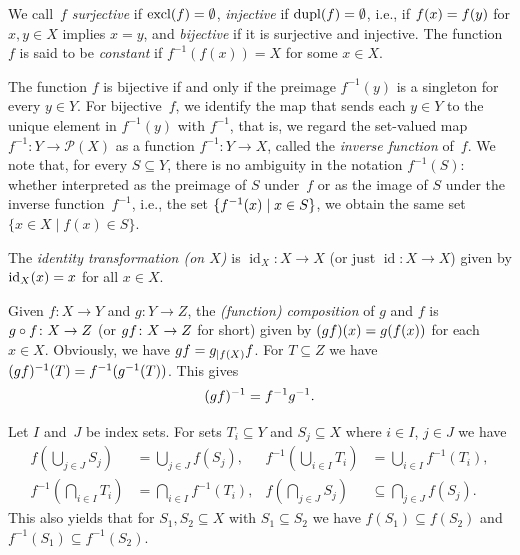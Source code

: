 We call~$f$ \emph{surjective} if $\excl{f} = \emptyset$, 
\emph{injective} 
if $\dupl{f} = \emptyset$, 
i.e., if $\applyfunc{x}{f} = \applyfunc{y}{f}$ for $x,y \in X$ implies $x = y$,
and \emph{bijective} if it is surjective and injective.
The function $f$ is said to be \emph{constant}
if $f^{-1}(f(x)) = X$ for some $x \in X$.

The function $f$ is bijective if and only if the preimage $f^{-1}(y)$ is a
singleton for every $y \in Y$. For bijective~$f$, we identify the map that
sends each $y \in Y$ to the unique element in $f^{-1}(y)$ with $f^{-1}$,
that is, we regard the set-valued map
$f^{-1} \colon Y \to \mathcal P(X)$ as a function
$f^{-1} \colon Y \to X$, called the \emph{inverse function} of~$f$.
We note that, for every $S \subseteq Y$, there is no ambiguity in the notation
$f^{-1}(S)$: whether interpreted as the preimage of $S$ under~$f$ or as the
image of $S$ under the inverse function~$f^{-1}$, i.e., the set 
$\{ \applyfunc{x}{f^{-1}} \mid x \in S \}$, we obtain the same set
$
\{ x \in X \mid f(x) \in S \}.
$

The \emph{identity transformation (on $X$)}
is $\operatorname{id}_X \colon X \to X$ (or just $\operatorname{id} \colon X \to X$) given by $\applyfunc{x}{\operatorname{id}_X} = x$
for all $x \in X$. 

\label{def:fun_comp}
Given $f \colon X \to Y$ and $g \colon Y \to Z$, the \emph{(function) composition} of $g$ and $f$
is $\concatcirc{f}{g} \colon X \to Z$ (or $\concat{f}{g} \colon X \to Z$ for short) given by $(\concat{f}{g})(x) = \applyfunc{\applyfunc{x}{f}}{g}$
for each $x \in X$. 
Obviously, we have
${\concat{f}{g}} = {\concat{f}{g_{|f(X)}}}$. For $T \subseteq Z$
we have $(\concat{f}{g})^{-1}(T) = f^{-1}(g^{-1}(T))$. This gives
\begin{equation} \label{prelim:eqn:invcomp}
	(\concat{f}{g})^{-1} = \concat{g^{-1}}{f^{-1}}.
\end{equation}

Let $I$ and~$J$ be index sets. For sets $T_i \subseteq Y$ and $S_j \subseteq X$
where $i \in I$, $j \in J$ we have
\begin{align*}
	f\left(\bigcup_{j \in J} S_j \right) & = \bigcup_{j \in J} f(S_j), &
	f^{-1}\left(\bigcup_{i \in I} T_i \right) &= \bigcup_{i \in I} f^{-1}(T_i), \\
	f^{-1}\left( \bigcap_{i \in I} T_i \right) & = \bigcap_{i \in I} f^{-1}(T_i), &
	f\left(\bigcap_{j \in J} S_j \right) & \subseteq \bigcap_{j \in J} f(S_j).
\end{align*}
This also yields that for $S_1, S_2 \subseteq X$ with $S_1 \subseteq S_2$
we have $f(S_1) \subseteq f(S_2)$ and $f^{-1}(S_1) \subseteq f^{-1}(S_2)$.


